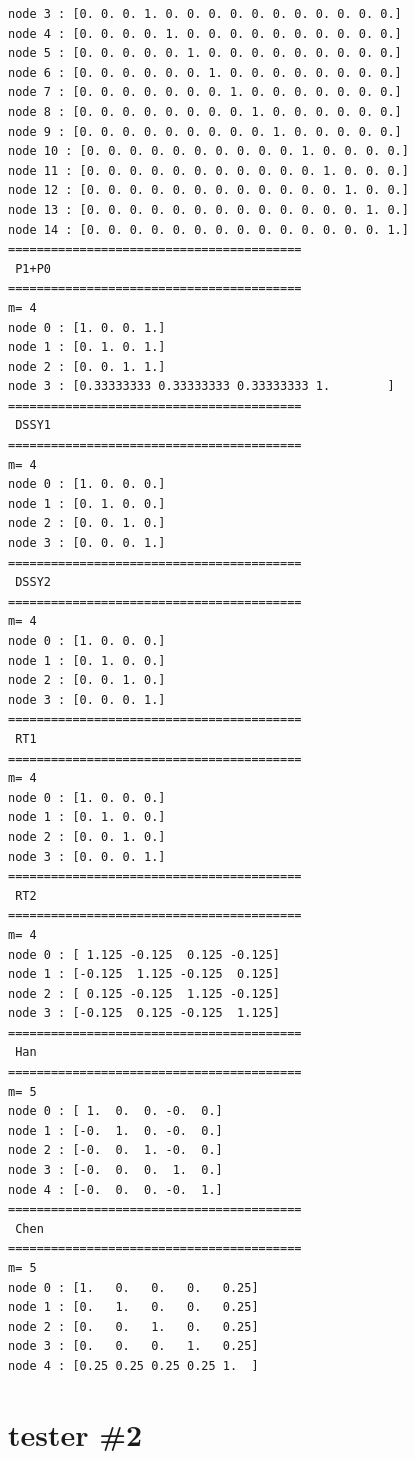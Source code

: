 \begin{scriptsize}
\begin{verbatim}
node 3 : [0. 0. 0. 1. 0. 0. 0. 0. 0. 0. 0. 0. 0. 0. 0.]
node 4 : [0. 0. 0. 0. 1. 0. 0. 0. 0. 0. 0. 0. 0. 0. 0.]
node 5 : [0. 0. 0. 0. 0. 1. 0. 0. 0. 0. 0. 0. 0. 0. 0.]
node 6 : [0. 0. 0. 0. 0. 0. 1. 0. 0. 0. 0. 0. 0. 0. 0.]
node 7 : [0. 0. 0. 0. 0. 0. 0. 1. 0. 0. 0. 0. 0. 0. 0.]
node 8 : [0. 0. 0. 0. 0. 0. 0. 0. 1. 0. 0. 0. 0. 0. 0.]
node 9 : [0. 0. 0. 0. 0. 0. 0. 0. 0. 1. 0. 0. 0. 0. 0.]
node 10 : [0. 0. 0. 0. 0. 0. 0. 0. 0. 0. 1. 0. 0. 0. 0.]
node 11 : [0. 0. 0. 0. 0. 0. 0. 0. 0. 0. 0. 1. 0. 0. 0.]
node 12 : [0. 0. 0. 0. 0. 0. 0. 0. 0. 0. 0. 0. 1. 0. 0.]
node 13 : [0. 0. 0. 0. 0. 0. 0. 0. 0. 0. 0. 0. 0. 1. 0.]
node 14 : [0. 0. 0. 0. 0. 0. 0. 0. 0. 0. 0. 0. 0. 0. 1.]
=========================================
 P1+P0
=========================================
m= 4
node 0 : [1. 0. 0. 1.]
node 1 : [0. 1. 0. 1.]
node 2 : [0. 0. 1. 1.]
node 3 : [0.33333333 0.33333333 0.33333333 1.        ]
=========================================
 DSSY1
=========================================
m= 4
node 0 : [1. 0. 0. 0.]
node 1 : [0. 1. 0. 0.]
node 2 : [0. 0. 1. 0.]
node 3 : [0. 0. 0. 1.]
=========================================
 DSSY2
=========================================
m= 4
node 0 : [1. 0. 0. 0.]
node 1 : [0. 1. 0. 0.]
node 2 : [0. 0. 1. 0.]
node 3 : [0. 0. 0. 1.]
=========================================
 RT1
=========================================
m= 4
node 0 : [1. 0. 0. 0.]
node 1 : [0. 1. 0. 0.]
node 2 : [0. 0. 1. 0.]
node 3 : [0. 0. 0. 1.]
=========================================
 RT2
=========================================
m= 4
node 0 : [ 1.125 -0.125  0.125 -0.125]
node 1 : [-0.125  1.125 -0.125  0.125]
node 2 : [ 0.125 -0.125  1.125 -0.125]
node 3 : [-0.125  0.125 -0.125  1.125]
=========================================
 Han
=========================================
m= 5
node 0 : [ 1.  0.  0. -0.  0.]
node 1 : [-0.  1.  0. -0.  0.]
node 2 : [-0.  0.  1. -0.  0.]
node 3 : [-0.  0.  0.  1.  0.]
node 4 : [-0.  0.  0. -0.  1.]
=========================================
 Chen
=========================================
m= 5
node 0 : [1.   0.   0.   0.   0.25]
node 1 : [0.   1.   0.   0.   0.25]
node 2 : [0.   0.   1.   0.   0.25]
node 3 : [0.   0.   0.   1.   0.25]
node 4 : [0.25 0.25 0.25 0.25 1.  ]

\end{verbatim}
\end{scriptsize}


\newpage
\section*{tester \#2}


